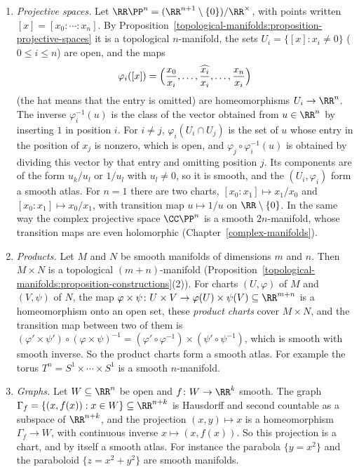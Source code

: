 \begin{example}
\begin{enumerate}
\[\]
This map is smooth on $\RR^n \setminus \{0\}$ and is its own inverse, so the two charts are compatible and form a smooth atlas of $S^n$.
\item \emph{Projective spaces.} Let $\RR\PP^n = (\RR^{n+1} \setminus \{0\})/\RR^\times$, with points written $[x] = [x_0 : \cdots : x_n]$. By
Proposition~\ref{topological-manifolds:proposition-projective-spaces} it is a topological $n$-manifold, the sets $U_i = \{[x] : x_i \neq 0\}$ ($0 \leq i \leq n$)
are open, and the maps
\[
\varphi_i([x]) = \Bigl(\frac{x_0}{x_i}, \ldots, \widehat{\frac{x_i}{x_i}}, \ldots, \frac{x_n}{x_i}\Bigr)
\]
(the hat means that the entry is omitted) are homeomorphisms $U_i \to \RR^n$. The inverse $\varphi_i^{-1}(u)$ is the class of the vector obtained from
$u \in \RR^n$ by inserting $1$ in position $i$. For $i \neq j$, $\varphi_i(U_i \cap U_j)$ is the set of $u$ whose entry in the position of $x_j$ is nonzero,
which is open, and $\varphi_j \circ \varphi_i^{-1}(u)$ is obtained by dividing this vector by that entry and omitting position $j$. Its components are of the
form $u_k/u_l$ or $1/u_l$ with $u_l \neq 0$, so it is smooth, and the $(U_i, \varphi_i)$ form a smooth atlas. For $n = 1$ there are two charts,
$[x_0 : x_1] \mapsto x_1/x_0$ and $[x_0 : x_1] \mapsto x_0/x_1$, with transition map $u \mapsto 1/u$ on $\RR \setminus \{0\}$. In the same way the complex
projective space $\CC\PP^n$ is a smooth $2n$-manifold, whose transition maps are even holomorphic (Chapter~\ref{complex-manifolds}).
\item \emph{Products.} Let $M$ and $N$ be smooth manifolds of dimensions $m$ and $n$. Then $M \times N$ is a topological $(m + n)$-manifold
(Proposition~\ref{topological-manifolds:proposition-constructions}(2)). For charts $(U, \varphi)$ of $M$ and $(V, \psi)$ of $N$, the map
$\varphi \times \psi \colon U \times V \to \varphi(U) \times \psi(V) \subseteq \RR^{m+n}$ is a homeomorphism onto an open set, these \emph{product charts} cover
$M \times N$, and the transition map between two of them is
$(\varphi' \times \psi') \circ (\varphi \times \psi)^{-1} = (\varphi' \circ \varphi^{-1}) \times (\psi' \circ \psi^{-1})$, which is smooth with smooth inverse. So
the product charts form a smooth atlas. For example the torus $T^n = S^1 \times \cdots \times S^1$ is a smooth $n$-manifold.
\item \emph{Graphs.} Let $W \subseteq \RR^n$ be open and $f \colon W \to \RR^k$ smooth. The graph $\Gamma_f = \{(x, f(x)) : x \in W\} \subseteq \RR^{n+k}$ is
Hausdorff and second countable as a subspace of $\RR^{n+k}$, and the projection $(x, y) \mapsto x$ is a homeomorphism $\Gamma_f \to W$, with continuous
inverse $x \mapsto (x, f(x))$. So this projection is a chart, and by itself a smooth atlas. For instance the parabola $\{y = x^2\}$ and the paraboloid
$\{z = x^2 + y^2\}$ are smooth manifolds.
\end{enumerate}
\end{example}

